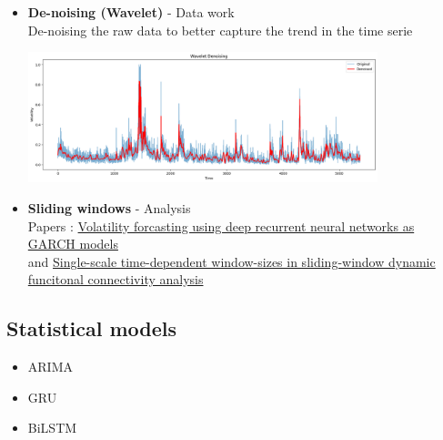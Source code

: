\documentclass[letterpaper,11pt]{article}
\begin{document}
\begin{itemize}
  \item \textbf{De-noising (Wavelet)} - Data work\\
  De-noising the raw data to better capture the trend in the time serie
  \begin{center}
    \includegraphics[width=0.8\textwidth]{img/wavelet.png}
    \end{center}
  \item \textbf{Sliding windows} - Analysis\\
  Papers : \href{https://link.springer.com/content/pdf/10.1007/s00180-023-01349-1.pdf}{Volatility forcasting using deep recurrent neural networks as GARCH models}\\
  and \href{https://www.sciencedirect.com/science/article/pii/S1053811920305978}{Single-scale time-dependent window-sizes in sliding-window dynamic funcitonal connectivity analysis}
  
\end{itemize}


\subsection*{Statistical models}
\begin{itemize}
  \item ARIMA
  \item GRU
  \item BiLSTM
\end{itemize}
\end{document}
